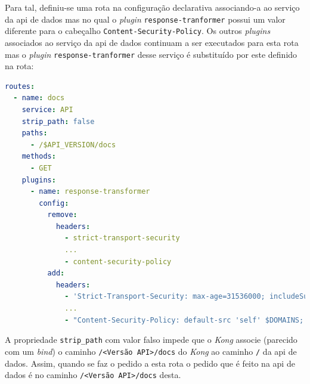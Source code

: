 Para tal, definiu-se uma rota na configuração declarativa associando-a ao serviço da \acrshort{api} de dados mas no qual o \textit{plugin} \texttt{response-tranformer} possui um valor diferente para o cabeçalho \texttt{Content-Security-Policy}. Os outros \textit{plugins} associados ao serviço da \acrshort{api} de dados continuam a ser executados para esta rota mas o \textit{plugin} \texttt{response-tranformer} desse serviço é substituído por este definido na rota:
\begin{lstlisting}[language=yaml, caption=Configuração declarativa do \textit{Kong}: Rota da documentação]
routes:
  - name: docs
    service: API
    strip_path: false
    paths:
      - /$API_VERSION/docs
    methods:
      - GET
    plugins:
      - name: response-transformer
        config:
          remove:
            headers:
              - strict-transport-security
              ...
              - content-security-policy
          add:
            headers:
              - 'Strict-Transport-Security: max-age=31536000; includeSubDomains; preload'
              ...
              - "Content-Security-Policy: default-src 'self' $DOMAINS; img-src 'self' https://validator.swagger.io data: $DOMAINS; style-src 'self' 'unsafe-inline' $DOMAINS; script-src 'self' 'unsafe-inline' $DOMAINS"
\end{lstlisting}

A propriedade \texttt{strip\_path} com valor falso impede que o \textit{Kong} associe (parecido com um \textit{bind}) o caminho \texttt{/<Versão API>/docs} do \textit{Kong} ao caminho \texttt{/} da \acrshort{api} de dados. Assim, quando se faz o pedido a esta rota o pedido que é feito na \acrshort{api} de dados é no caminho \texttt{/<Versão API>/docs} desta. 

